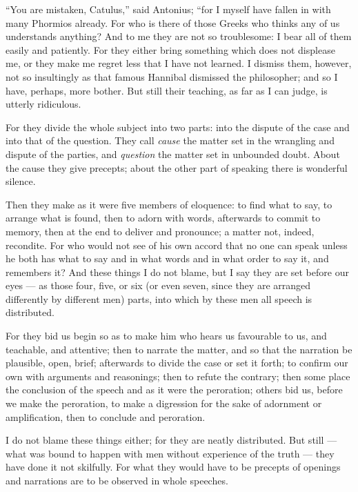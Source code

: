  ``You are mistaken, Catulus,'' said Antonius; ``for I myself have fallen in with many Phormios already. For who is there of those Greeks who thinks any of us understands anything? And to me they are not so troublesome: I bear all of them easily and patiently. For they either bring something which does not displease me, or they make me regret less that I have not learned. I dismiss them, however, not so insultingly as that famous Hannibal dismissed the philosopher; and so I have, perhaps, more bother. But still their teaching, as far as I can judge, is utterly ridiculous.

 For they divide the whole subject into two parts: into the dispute of the case and into that of the question. They call \textit{cause} the matter set in the wrangling and dispute of the parties, and \textit{question} the matter set in unbounded doubt. About the cause they give precepts; about the other part of speaking there is wonderful silence.

 Then they make as it were five members of eloquence: to find what to say, to arrange what is found, then to adorn with words, afterwards to commit to memory, then at the end to deliver and pronounce; a matter not, indeed, recondite. For who would not see of his own accord that no one can speak unless he both has what to say and in what words and in what order to say it, and remembers it? And these things I do not blame, but I say they are set before our eyes — as those four, five, or six (or even seven, since they are arranged differently by different men) parts, into which by these men all speech is distributed.

 For they bid us begin so as to make him who hears us favourable to us, and teachable, and attentive; then to narrate the matter, and so that the narration be plausible, open, brief; afterwards to divide the case or set it forth; to confirm our own with arguments and reasonings; then to refute the contrary; then some place the conclusion of the speech and as it were the peroration; others bid us, before we make the peroration, to make a digression for the sake of adornment or amplification, then to conclude and peroration.

 I do not blame these things either; for they are neatly distributed. But still — what was bound to happen with men without experience of the truth — they have done it not skilfully. For what they would have to be precepts of openings and narrations are to be observed in whole speeches.

